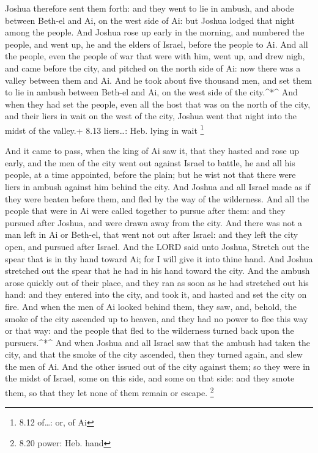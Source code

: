  Joshua therefore sent them forth: and they went to lie in
ambush, and abode between Beth-el and Ai, on the west side of Ai: but
Joshua lodged that night among the people.  And Joshua rose
up early in the morning, and numbered the people, and went up, he and
the elders of Israel, before the people to Ai.  And all the
people, even the people of war that were with him, went up, and drew
nigh, and came before the city, and pitched on the north side of Ai: now
there was a valley between them and Ai.  And he took about
five thousand men, and set them to lie in ambush between Beth-el and Ai,
on the west side of the city.\^{}*\^{}  And when they had
set the people, even all the host that was on the north of the city, and
their liers in wait on the west of the city, Joshua went that night into
the midst of the valley.+ 8.13 liers\ldots: Heb. lying in wait
\footnote{8.12 of\ldots: or, of Ai}

 And it came to pass, when the king of Ai saw it, that they
hasted and rose up early, and the men of the city went out against
Israel to battle, he and all his people, at a time appointed, before the
plain; but he wist not that there were liers in ambush against him
behind the city.  And Joshua and all Israel made as if they
were beaten before them, and fled by the way of the wilderness.
 And all the people that were in Ai were called together to
pursue after them: and they pursued after Joshua, and were drawn away
from the city.  And there was not a man left in Ai or
Beth-el, that went not out after Israel: and they left the city open,
and pursued after Israel.  And the LORD said unto Joshua,
Stretch out the spear that is in thy hand toward Ai; for I will give it
into thine hand. And Joshua stretched out the spear that he had in his
hand toward the city.  And the ambush arose quickly out of
their place, and they ran as soon as he had stretched out his hand: and
they entered into the city, and took it, and hasted and set the city on
fire.  And when the men of Ai looked behind them, they saw,
and, behold, the smoke of the city ascended up to heaven, and they had
no power to flee this way or that way: and the people that fled to the
wilderness turned back upon the pursuers.\^{}*\^{}  And
when Joshua and all Israel saw that the ambush had taken the city, and
that the smoke of the city ascended, then they turned again, and slew
the men of Ai.  And the other issued out of the city
against them; so they were in the midst of Israel, some on this side,
and some on that side: and they smote them, so that they let none of
them remain or escape. \footnote{8.20 power: Heb. hand}

